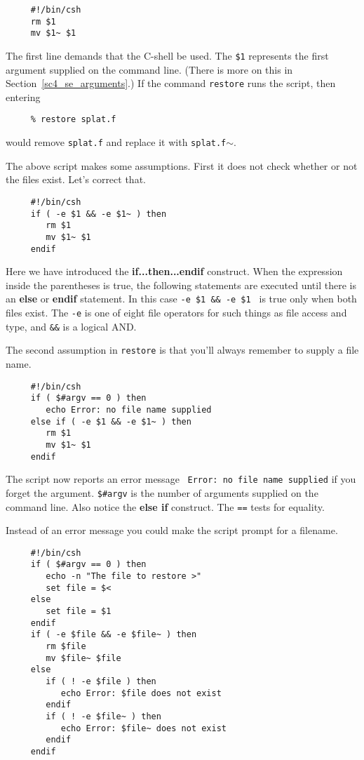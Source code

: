 \documentclass[twoside,11pt]{article}
\newcommand{\htmlref}[2]{#1}
\newcommand{\latexelsehtml}[2]{#1}
\newcommand{\latexelsehtml}[2]{#2}
\begin{document}
\small
\begin{verbatim}
     #!/bin/csh
     rm $1
     mv $1~ $1
\end{verbatim}
\normalsize
The first line demands that the C-shell be used.
The {\tt \$1} represents the first argument supplied on the command line.
(There is more on this in 
\latexelsehtml{Section~\ref{sc4_se_arguments}.)}{\htmlref{Script
arguments and other special variables}{sc4_se_arguments}.)}
If the command {\tt restore} runs the script, then entering

\small
\begin{verbatim}
     % restore splat.f
\end{verbatim}
\normalsize
would remove {\tt splat.f} and replace it with {\tt splat.f$\sim$}.

The above script makes some assumptions.  First it does not check
whether or not the files exist.  Let's correct that.

\small
\begin{verbatim}
     #!/bin/csh
     if ( -e $1 && -e $1~ ) then
        rm $1
        mv $1~ $1
     endif
\end{verbatim}
\normalsize

Here we have introduced the {\bf if...then...endif} construct.  When
the expression inside the parentheses is true, the following statements
are executed until there is an {\bf else} or {\bf endif} statement.
In this case {\tt -e \$1 \&\& -e \$1~} is true only when both files exist.
The {\tt -e} is one of eight {\sf file operators} for such things as
file access and type, and {\tt \&\&} is a logical AND.

The second assumption in {\tt restore} is that you'll always remember
to supply a file name.

\small
\begin{verbatim}
     #!/bin/csh
     if ( $#argv == 0 ) then
        echo Error: no file name supplied
     else if ( -e $1 && -e $1~ ) then
        rm $1
        mv $1~ $1
     endif
\end{verbatim}
\normalsize
The script now reports an error message ~\mbox{{\tt Error:~no file name
supplied}} if you forget the argument.  {\tt \$\#argv} is the number of
arguments supplied on the command line.  Also notice the {\bf else if}
construct.  The {\tt ==} tests for equality.

Instead of an error message you could make the script prompt for a
filename.

\small
\begin{verbatim}
     #!/bin/csh
     if ( $#argv == 0 ) then
        echo -n "The file to restore >"
        set file = $<
     else
        set file = $1
     endif
     if ( -e $file && -e $file~ ) then
        rm $file
        mv $file~ $file
     else 
        if ( ! -e $file ) then
           echo Error: $file does not exist
        endif
        if ( ! -e $file~ ) then
           echo Error: $file~ does not exist
        endif
     endif
\end{verbatim}
\normalsize
\end{document}
